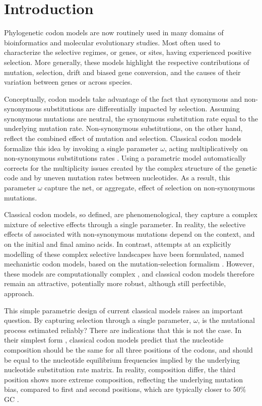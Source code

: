 
\section{Introduction}

Phylogenetic codon models are now routinely used in many domains of bioinformatics and molecular evolutionary studies.
Most often used to characterize the selective regimes, or genes, or sites, having experienced positive selection.
More generally, these models highlight the respective contributions of mutation, selection, drift and biased gene conversion, and the causes of their variation between genes or across species.

Conceptually, codon models take advantage of the fact that synonymous and non-synonymous substitutions are differentially impacted by selection.
Assuming synonymous mutations are neutral, the synonymous substitution rate equal to the underlying mutation rate.
Non-synonymous substitutions, on the other hand, reflect the combined effect of mutation and selection.
Classical codon models formalize this idea by invoking a single parameter $\omega$, acting multiplicatively on non-synonymous substitutions rates \citep{Muse1994, Goldman1994}.
Using a parametric model automatically corrects for the multiplicity issues created by the complex structure of the genetic code and by uneven mutation rates between nucleotides.
As a result, this parameter $\omega$ capture the net, or aggregate, effect of selection on non-synonymous mutations.

Classical codon models, so defined, are phenomenological, they capture a complex mixture of selective effects through a single parameter.
In reality, the selective effects of associated with non-synonymous mutations depend on the context, and on the initial and final amino acids.
In contrast, attempts at an explicitly modelling of these complex selective landscapes have been formulated, named mechanistic codon models, based on the mutation-selection formalism \citep{Halpern1998}.
However, these models are computationally complex \citep{Rodrigue2010, Tamuri2012}, and classical codon models therefore remain an attractive, potentially more robust, although still perfectible, approach.

This simple parametric design of current classical models raises an important question.
By capturing selection through a single parameter, $\omega$, is the mutational process estimated reliably?
There are indications that this is not the case.
In their simplest form \citep{Muse1994}, classical codon models predict that the nucleotide composition should be the same for all three positions of the codons, and should be equal to the nucleotide equilibrium frequencies implied by the underlying nucleotide substitution rate matrix.
In reality, composition differ, the third position shows more extreme composition, reflecting the underlying mutation bias, compared to first and second positions, which are typically closer to 50\% GC \citep{Singer2000}.

